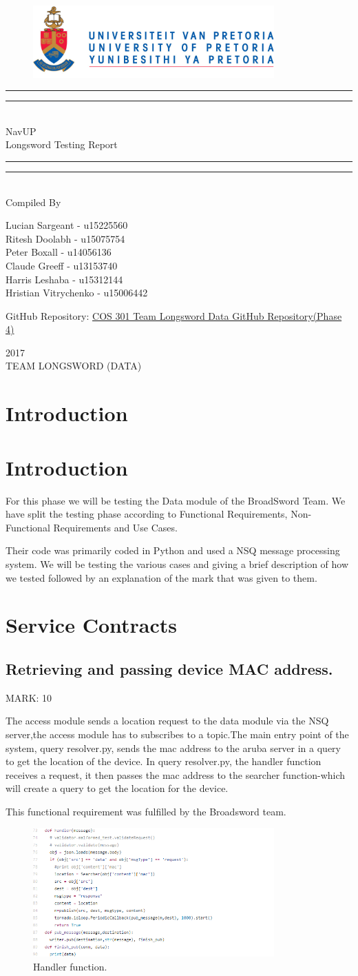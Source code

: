 \documentclass{article}
\newcommand*{\titleGP}{\begingroup
		\begin{figure}[t]
			\centering
			\includegraphics[width=350px]{UP_Logo.PNG}
		\end{figure}
\centering 
\vspace*{\baselineskip}

\rule{\textwidth}{1.6pt}\vspace*{-\baselineskip}\vspace*{2pt}
\rule{\textwidth}{0.4pt}\\[\baselineskip]

{\LARGE NavUP\\ [0.3\baselineskip] Longsword Testing Report } \\ [0.2\baselineskip]
\rule{\textwidth}{0.4pt}\vspace*{-\baselineskip}\vspace{3.2pt}
\rule{\textwidth}{1.6pt}\\[\baselineskip] %



Compiled By \\[\baselineskip]
{\Large Lucian Sargeant - u15225560 \\ Ritesh Doolabh - u15075754 \\ Peter Boxall -  u14056136 \\ Claude Greeff - u13153740\\ Harris Leshaba - u15312144 \\ Hristian Vitrychenko - u15006442\par}

\bigskip
\bigskip

 	GitHub Repository:  
 	\href{https://github.com/Chris19951225/COS-301-Longsword-Data-Streaming}{COS 301 Team Longsword Data GitHub Repository(Phase 4)}




 

\vfill


{\scshape 2017} \\[0.3\baselineskip]
{\large TEAM LONGSWORD (DATA)}\par

\endgroup}
\begin{document}
\titleGP
\newpage
\tableofcontents

\newpage
\section{Introduction}
\section{Introduction}
\begin{flushleft}
For this phase we will be testing the Data module of the BroadSword Team. We have split the testing phase according to Functional Requirements, Non-Functional Requirements and Use Cases. 
\end{flushleft}

\begin{flushleft}
Their code was primarily coded in Python and used a NSQ message processing system.
We will be testing the various cases and giving a brief description of how we tested followed by an explanation of the mark that was given to them.
\end{flushleft}


\section{Service Contracts}

\subsection{Retrieving and passing device MAC address.}
\begin{flushleft}
MARK: 10
\end{flushleft}

\begin{flushleft}
The access module sends a location request to the data module via the NSQ server,the access module has to subscribes to a topic.The main entry point of the system, query resolver.py, sends the mac address to the aruba server in a query to get the location of the device.
In query resolver.py, the handler function receives a request, it then passes the mac address to the searcher function-which will create a query to get the location for the device.
\end{flushleft}

\begin{flushleft}
This functional requirement was fulfilled by the Broadsword team.
\end{flushleft}
\begin{figure}[ht]
  \includegraphics[width=350px]{Handler.png}

\caption{Handler function.}
  \label{Handler function}
\end{figure}
\end{document}
